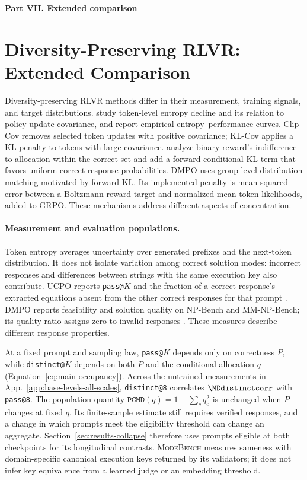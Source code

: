 \documentclass{article}
\makeatletter
\newcommand{\1}{\mathbf 1}
\newcommand{\mb}{\textsc{ModeBench}}
\newcommand{\pmd}{\texttt{PCMD}}
\newcommand{\distk}{\texttt{distinct@8}}
\theoremstyle{remark}
\theoremstyle{definition}
\theoremstyle{plain}
\makeatother
\begin{document}
\clearpage
{}
\begin{center}\large\textbf{Part VII. Extended comparison}\end{center}

\section{Diversity-Preserving RLVR: Extended Comparison}
\label{app:related-extended}

Diversity-preserving RLVR methods differ in their measurement, training
signals, and target distributions. \citet{cui2025entropy} study token-level
entropy decline and its relation to policy-update covariance, and report
empirical entropy--performance curves. Clip-Cov removes selected token
updates with positive covariance; KL-Cov applies a KL penalty to tokens with
large covariance. \citet{lochab2026ucpo} analyze binary reward's indifference
to allocation within the correct set and add a forward conditional-KL term
that favors uniform correct-response probabilities. DMPO
\citep{li2026distribution} uses group-level distribution matching motivated
by forward KL. Its implemented penalty is mean squared error between a
Boltzmann reward target and normalized mean-token likelihoods, added to
GRPO. These mechanisms address different aspects of concentration.

\paragraph{Measurement and evaluation populations.}
Token entropy averages uncertainty over generated prefixes and the next-token
distribution. It does not isolate variation among correct solution modes:
incorrect responses and differences between strings with the same execution
key also contribute. UCPO reports \texttt{pass@}$K$ and the fraction of a
correct response's extracted equations absent from the other correct
responses for that prompt \citep[App.~F]{lochab2026ucpo}. DMPO reports
feasibility and solution quality on NP-Bench and MM-NP-Bench; its quality
ratio assigns zero to invalid responses \citep[Section~4.2]{li2026distribution}.
These measures describe different response properties.

At a fixed prompt and sampling law, \texttt{pass@}$K$ depends only on
correctness $P$, while \texttt{distinct@}$K$ depends on both $P$ and the
conditional allocation $q$ (Equation~\eqref{eq:main-occupancy}). Across the
\MDcells{} untrained measurements in App.~\ref{app:base-levels-all-scales},
\distk{} correlates $\MDdistinctcorr$ with \texttt{pass@8}.
The population quantity $\pmd(q)=1-\sum_cq_c^2$ is unchanged when $P$
changes at fixed $q$. Its finite-sample estimate still requires verified
responses, and a change in which prompts meet the eligibility threshold
can change an aggregate. Section~\ref{sec:results-collapse} therefore uses
prompts eligible at both checkpoints for its longitudinal contrasts.
\mb{} measures sameness with domain-specific canonical execution keys
returned by its validators; it does not infer key equivalence from a learned
judge or an embedding threshold.
\end{document}
